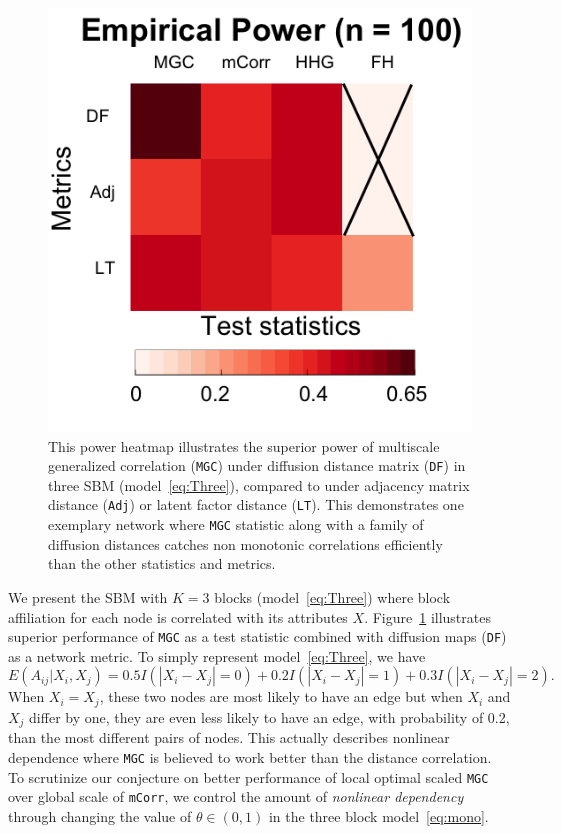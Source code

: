 \documentclass[11pt]{article}
\theoremstyle{definition}
\begin{document}
\begin{figure}
	\centering
	\includegraphics[width=0.4\paperwidth, height=0.4\paperwidth]{../Figure/ThreeSBM_results_simple.png}
	\caption{This power heatmap illustrates the superior power of multiscale generalized correlation (\texttt{MGC}) under diffusion distance matrix (\texttt{DF}) in three SBM (model~\ref{eq:Three}), compared to under adjacency matrix distance (\texttt{Adj}) or latent factor distance (\texttt{LT}). This demonstrates one exemplary network where \texttt{MGC} statistic along with a family of diffusion distances catches non monotonic correlations efficiently than the other statistics and metrics.}
	\label{fig:threeSBM}
\end{figure}
We present the SBM with $K=3$ blocks (model~\ref{eq:Three}) where block affiliation for each node is correlated with its attributes $X$. Figure~\ref{fig:threeSBM} illustrates superior performance of \texttt{MGC} as a test statistic combined with diffusion maps (\texttt{DF}) as a network metric. To simply represent model~\ref{eq:Three}, we have
\begin{equation}
E(A_{ij} | X_{i}, X_{j}) = 0.5 I(|X_{i} - X_{j}| = 0) + 0.2 I(|X_{i} - X_{j}| = 1) + 0.3 I(|X_{i} - X_{j}| = 2).
\end{equation}
When $X_{i} = X_{j}$, these two nodes are most likely to have an edge but when $X_{i}$ and  $X_{j}$ differ by one, they are even less likely to have an edge, with probability of 0.2, than the most different pairs of nodes. This actually describes nonlinear dependence where \texttt{MGC} is believed to work better than the distance correlation. To scrutinize our conjecture on better performance of local optimal scaled \texttt{MGC} over global scale of \texttt{mCorr}, we control the amount of \textit{nonlinear dependency} through changing the value of $\theta \in (0, 1)$ in the three block model~\ref{eq:mono}. 
\end{document}
